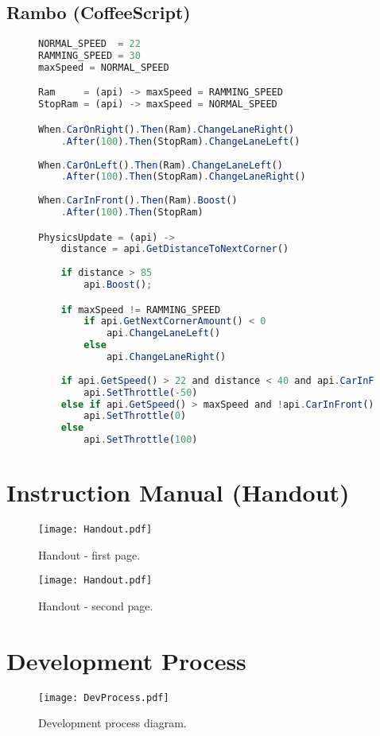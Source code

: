 \subsection{Rambo (CoffeeScript)}
\label{coffeerambo}
\begin{figure}[H]
\begin{lstlisting}[language=JavaScript]
NORMAL_SPEED  = 22
RAMMING_SPEED = 30
maxSpeed = NORMAL_SPEED

Ram     = (api) -> maxSpeed = RAMMING_SPEED
StopRam = (api) -> maxSpeed = NORMAL_SPEED

When.CarOnRight().Then(Ram).ChangeLaneRight()
    .After(100).Then(StopRam).ChangeLaneLeft()
    
When.CarOnLeft().Then(Ram).ChangeLaneLeft()
    .After(100).Then(StopRam).ChangeLaneRight()
    
When.CarInFront().Then(Ram).Boost()
    .After(100).Then(StopRam)

PhysicsUpdate = (api) -> 
    distance = api.GetDistanceToNextCorner() 
    
    if distance > 85
        api.Boost(); 

    if maxSpeed != RAMMING_SPEED 
        if api.GetNextCornerAmount() < 0 
            api.ChangeLaneLeft() 
        else
            api.ChangeLaneRight()
    
    if api.GetSpeed() > 22 and distance < 40 and api.CarInFront() 
        api.SetThrottle(-50) 
    else if api.GetSpeed() > maxSpeed and !api.CarInFront() 
        api.SetThrottle(0) 
    else
        api.SetThrottle(100)
\end{lstlisting}
\end{figure}

\section{Instruction Manual (Handout)}

\begin{figure}[H]
\centering
\texttt{[image: Handout.pdf]}
\caption{Handout - first page.}
\end{figure}
\begin{figure}[H]
\centering
\texttt{[image: Handout.pdf]}
\caption{Handout - second page.}
\end{figure}

\section{Development Process}

\begin{figure}[H]
\centering
\texttt{[image: DevProcess.pdf]}
\caption{Development process diagram.}
\end{figure}